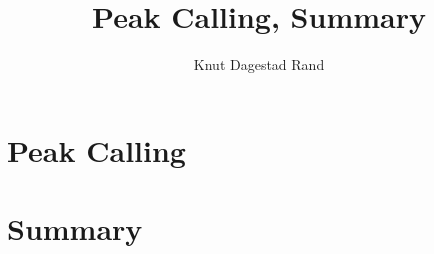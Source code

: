 \documentclass[]{article}
\title{Peak Calling, Summary}
\author{Knut Dagestad Rand}
\begin{document}
\maketitle
\section{Peak Calling}

\clearpage
\section{Summary}

\clearpage
\end{document}
